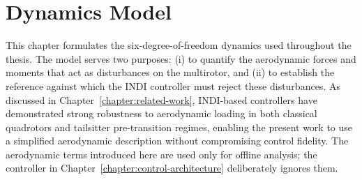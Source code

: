 
\chapter{Dynamics Model}\label{chapter:dynamics-model}

This chapter formulates the six-degree-of-freedom dynamics used throughout the thesis. The model serves two purposes: (i) to quantify the aerodynamic forces and moments that act as disturbances on the multirotor, and (ii) to establish the reference against which the INDI controller must reject these disturbances. As discussed in Chapter~\ref{chapter:related-work}, INDI-based controllers have demonstrated strong robustness to aerodynamic loading in both classical quadrotors and tailsitter pre-transition regimes, enabling the present work to use a simplified aerodynamic description without compromising control fidelity. The aerodynamic terms introduced here are used only for offline analysis; the controller in Chapter~\ref{chapter:control-architecture} deliberately ignores them.

